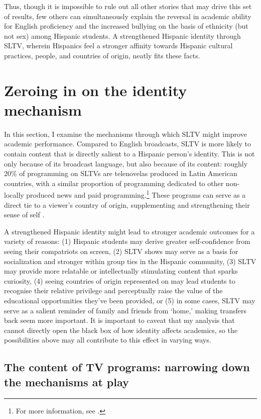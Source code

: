 \documentclass[11pt]{article}
\begin{document}
Thus, though it is impossible to rule out all other stories that may drive this set of results, few others can simultaneously explain the reversal in academic ability for English proficiency and the increased bullying on the basis of ethnicity (but not sex) among Hispanic students. A strengthened Hispanic identity through SLTV, wherein Hispanics feel a stronger affinity towards Hispanic cultural practices, people, and countries of origin, neatly fits these facts.



\section{Zeroing in on the identity mechanism}\label{s:mech}

In this section, I examine the mechanisms through which SLTV might improve academic performance. Compared to English broadcasts, SLTV is more likely to contain content that is directly salient to a Hispanic person's identity. This is not only because of its broadcast language, but also because of its content: roughly 20\% of programming on SLTVs are telenovelas produced in Latin American countries, with a similar proportion of programming dedicated to other non-locally produced news and paid programming.\footnote{ For more information, see \cite{noauthor_hispanic_2016}. } These programs can serve as a direct tie to a viewer's country of origin, supplementing and strengthening their sense of self \citep{morales2016television}. 

A strengthened Hispanic identity might lead to stronger academic outcomes for a variety of reasons: (1) Hispanic students may derive greater self-confidence from seeing their compatriots on screen, (2) SLTV shows may serve as a basis for socialization and stronger within group ties in the Hispanic community, (3) SLTV may provide more relatable or intellectually stimulating content that sparks curiosity, (4) seeing countries of origin represented on may lead students to recognise their relative privilege and perceptually raise the value of the educational opportunities they've been provided, or (5) in some cases, SLTV may serve as a salient reminder of family and friends from `home,' making transfers back seem more important. It is important to caveat that my analysis that cannot directly open the black box of how identity affects academics, so the possibilities above may all contribute to this effect in varying ways.


\subsection{The content of TV programs: narrowing down the mechanisms at play} \label{s:transcripts}
\end{document}
